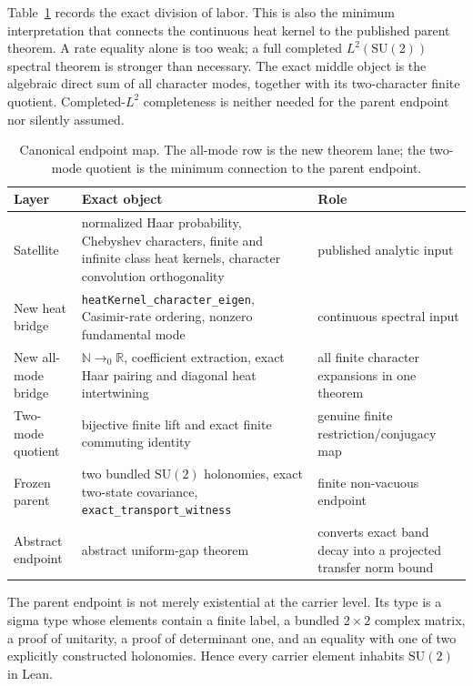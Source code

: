 \documentclass[11pt]{article}
\theoremstyle{definition}
\theoremstyle{remark}
\newcommand{\SU}{\mathrm{SU}(2)}
\begin{document}
Table~\ref{tab:endpoint} records the exact division of labor.  This is also the
minimum interpretation that connects the continuous heat kernel to the
published parent theorem.  A rate equality alone is too weak; a full completed
$L^2(\SU)$ spectral theorem is stronger than necessary.  The exact middle
object is the algebraic direct sum of all character modes, together with its
two-character finite quotient.  Completed-$L^2$ completeness is neither needed
for the parent endpoint nor silently assumed.

\begin{table}[ht]
\centering
\small
\begin{tabular}{p{}p{}p{}}
\toprule
Layer & Exact object & Role \\
\midrule
Satellite & normalized Haar probability, Chebyshev characters, finite and
infinite class heat kernels, character convolution orthogonality & published
analytic input \\
New heat bridge & \texttt{heatKernel\_character\_eigen}, Casimir-rate ordering,
nonzero fundamental mode & continuous spectral input \\
New all-mode bridge & $\mathbb N\to_0\mathbb R$, coefficient extraction,
exact Haar pairing and diagonal heat intertwining & all finite character
expansions in one theorem \\
Two-mode quotient & bijective finite lift and exact finite commuting identity
& genuine finite restriction/conjugacy map \\
Frozen parent & two bundled $\SU$ holonomies, exact two-state covariance,
\texttt{exact\_transport\_witness} & finite non-vacuous endpoint \\
Abstract endpoint & abstract uniform-gap theorem & converts exact
band decay into a projected transfer norm bound \\
\bottomrule
\end{tabular}
\caption{Canonical endpoint map.  The all-mode row is the new theorem lane;
the two-mode quotient is the minimum connection to the parent endpoint.}
\label{tab:endpoint}
\end{table}

The parent endpoint is not merely existential at the carrier level.  Its type
is a sigma type whose elements contain a finite label, a bundled $2\times2$
complex matrix, a proof of unitarity, a proof of determinant one, and an
equality with one of two explicitly constructed holonomies.  Hence every
carrier element inhabits $\SU$ in Lean.
\end{document}
